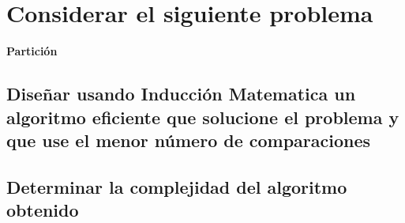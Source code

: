 \section{Considerar el siguiente problema}

\textbf{Partición}

\subsection{Diseñar usando Inducción Matematica un algoritmo eficiente que solucione el problema y que use el menor número de comparaciones}

\subsection{Determinar la complejidad del algoritmo obtenido}
